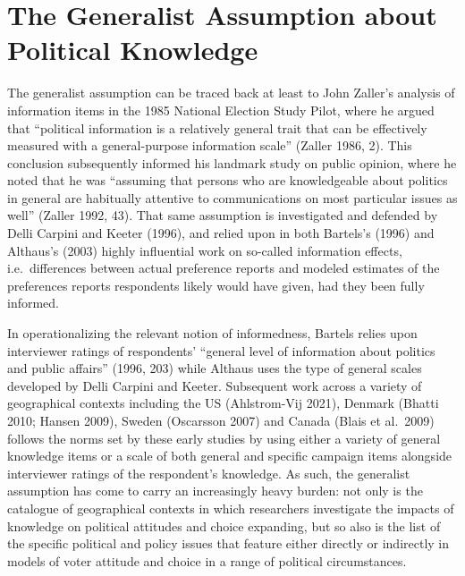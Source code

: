 \documentclass[11pt,halfline,a4paper,]{ouparticle}
\begin{document}
\hypertarget{the-generalist-assumption-about-political-knowledge}{%
\section{The Generalist Assumption about Political
Knowledge}\label{the-generalist-assumption-about-political-knowledge}}

The generalist assumption can be traced back at least to John Zaller's
analysis of information items in the 1985 National Election Study Pilot,
where he argued that ``political information is a relatively general
trait that can be effectively measured with a general-purpose
information scale'' (Zaller 1986, 2). This conclusion subsequently
informed his landmark study on public opinion, where he noted that he
was ``assuming that persons who are knowledgeable about politics in
general are habitually attentive to communications on most particular
issues as well'' (Zaller 1992, 43). That same assumption is investigated
and defended by Delli Carpini and Keeter (1996), and relied upon in both
Bartels's (1996) and Althaus's (2003) highly influential work on
so-called information effects, i.e.~differences between actual
preference reports and modeled estimates of the preferences reports
respondents likely would have given, had they been fully informed.

In operationalizing the relevant notion of informedness, Bartels relies
upon interviewer ratings of respondents' ``general level of information
about politics and public affairs'' (1996, 203) while Althaus uses the
type of general scales developed by Delli Carpini and Keeter. Subsequent
work across a variety of geographical contexts including the US
(Ahlstrom-Vij 2021), Denmark (Bhatti 2010; Hansen 2009), Sweden
(Oscarsson 2007) and Canada (Blais et al.~2009) follows the norms set by
these early studies by using either a variety of general knowledge items
or a scale of both general and specific campaign items alongside
interviewer ratings of the respondent's knowledge. As such, the
generalist assumption has come to carry an increasingly heavy burden:
not only is the catalogue of geographical contexts in which researchers
investigate the impacts of knowledge on political attitudes and choice
expanding, but so also is the list of the specific political and policy
issues that feature either directly or indirectly in models of voter
attitude and choice in a range of political circumstances.
\end{document}
